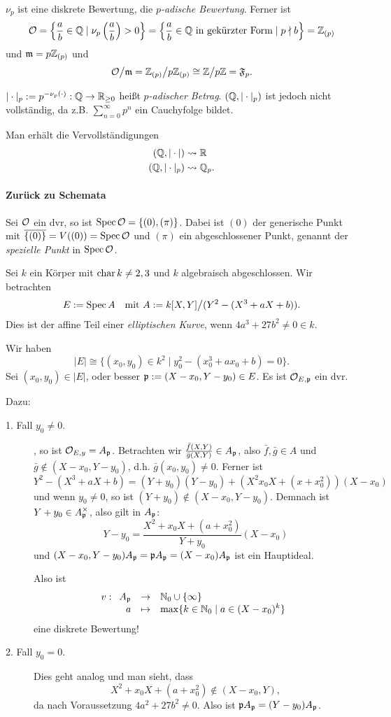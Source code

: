 $\nu_p$ ist eine diskrete Bewertung, die \emph{$p$-adische Bewertung}.
Ferner ist
\[
	\mathcal{O} = \left\{ \frac a b \in \mathbb{Q} \mid \nu_p\left(\frac a b\right) > 0
		\right\}
		=
		\left\{ \frac a b \in \mathbb{Q} \text{ in gekürzter Form} \mid 
			p\nmid b \right\}
		= \mathbb{Z}_{(p)}
\]
und $\mathfrak{m} = p \mathbb{Z}_{(p)}$ und 
\[
	\mathcal{O}\big/ \mathfrak{m} = \mathbb{Z}_{(p)} \big/ p\mathbb{Z}_{(p)} \cong
		\mathbb{Z} \big/ p\mathbb{Z} = \mathfrak F_p.
\]

$|\cdot|_p := p^{-\nu_p(\cdot)}: \mathbb{Q} \to \mathbb{R}_{\geq 0}$ heißt
\emph{$p$-adischer Betrag}.
$(\mathbb{Q}, |\cdot|_p)$ ist jedoch nicht vollständig, da
z.B. $\sum_{n=0}^\infty p^n$ ein Cauchyfolge bildet.

Man erhält die Vervollständigungen
\begin{align*}
	(\mathbb{Q}, |\cdot|) &\leadsto \mathbb{R}\\
	(\mathbb{Q}, |\cdot|_p) & \leadsto \mathbb{Q}_p.
\end{align*}

\paragraph{Zurück zu Schemata}
Sei $\mathcal{O}$ ein dvr, so ist $\operatorname{Spec} \mathcal{O} = \{(0), (\pi)\}$. Dabei ist
$(0)$ der generische Punkt mit $\overline{\{(0)\}} = V((0)) = \operatorname{Spec} \mathcal{O}$
und $(\pi)$ ein abgeschlossener Punkt, genannt der \emph{spezielle Punkt}
in $\operatorname{Spec} \mathcal{O}$.

\begin{beispiel}
	Sei $k$ ein Körper mit $\operatorname{char} k \neq 2,3$ und $k$ algebraisch 
	abgeschlossen. Wir betrachten
	\[
		E := \operatorname{Spec} A \quad \text{mit } 
			A := k[X,Y] \big/ (Y^2 - (X^3 + aX + b)).
	\]
	Dies ist der affine Teil einer \emph{elliptischen Kurve}, wenn
	$4a^3 + 27b^2 \neq 0 \in k$.
	
	Wir haben
	\[ |E| \cong \{ (x_0,y_0) \in k^2 \mid y_0^2 - (x_0^3 + ax_0 + b) = 0\}.
	\]
	Sei $(x_0,y_0) \in |E|$, oder besser $\mathfrak{p} := (X-x_0, Y - y_0) \in E$.
	Es ist $\mathcal{O}_{E,\mathfrak{p}}$ ein dvr.
	
	Dazu:
	\begin{description}
	\item[1. Fall $y_0 \neq 0$.], so ist
		$\mathcal{O}_{E,y} = A_\mathfrak{p}$. Betrachten wir
		$\frac{\bar f(X,Y)}{\bar g(X,Y)} \in A_\mathfrak{p}$, also
		$\bar f, \bar g \in A$ und $\bar g \notin (X-x_0, Y-y_0)$, d.h.
		$\bar g(x_0, y_0) \neq 0$. Ferner ist
		\[
			Y^2 - (X^3 + aX + b) = 
			(Y + y_0)(Y-y_0) + (X^2 x_0X + (x+x_0^2))(X-x_0)
		\]
		und wenn $y_0 \neq 0$, so ist
		$(Y+y_0) \notin (X-x_0, Y-y_0)$. Demnach ist
		$Y+y_0 \in A_\mathfrak{p}^\times$, also gilt in $A_\mathfrak{p}$:
		\[
			Y-y_0 = \frac{X^2 + x_0 X + (a+x_0^2)}{Y + y_0}(X-x_0)
		\]
		und
		$(X-x_0, Y-y_0) A_\mathfrak{p} = \mathfrak{p} A_\mathfrak{p} = (X-x_0)A_\mathfrak{p}$ ist 
		ein Hauptideal.
		
		Also ist
		\[
			v: \funcdef{ A_\p & \to & \N_0 \cup \{\infty\}\\
				a & \mapsto & \max\{k \in \N_0 \mid a \in (X-x_0)^k \}}
		\]
		eine diskrete Bewertung!
	\item[2. Fall $y_0 = 0$.] Dies geht analog und man sieht, dass
		\[
			X^2 + x_0 X + (a + x_0^2) \notin (X-x_0,Y),
		\]
		da nach Voraussetzung $4a^2 + 27b^2 \neq 0$. Also ist
		$\mathfrak{p} A_\mathfrak{p} = (Y - y_0) A_\mathfrak{p}$.
	\end{description} 
\end{beispiel}

